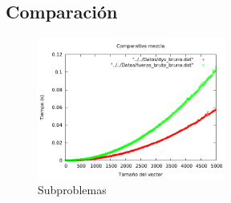 \subsection{Comparaci\'on}
\begin{figure}[htb] 
\centering
	\includegraphics[width=0.55\textwidth]{../Opcional/Graficas/comparativa.png}
	\caption{Subproblemas} 
	\label{fig:perros} 
\end{figure}

